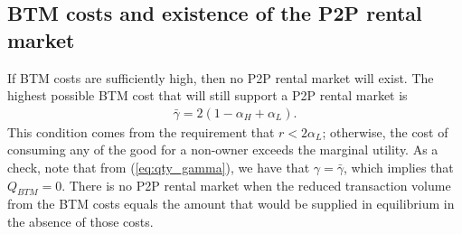 \documentclass[11pt]{article}
\begin{document}
\subsection{BTM costs and existence of the P2P rental market}
If BTM costs are sufficiently high, then no P2P rental market will exist. 
The highest possible BTM cost that will still support a P2P rental market is 
\begin{align} 
  \bar{\gamma} = 2(1-\alpha_H + \alpha_L). 
\end{align}
This condition comes from the requirement that  $r < 2 \alpha_L$; otherwise, the cost of consuming any of the good for a non-owner exceeds the marginal utility. 
As a check, note that from (\ref{eq:qty_gamma}), we have that $\gamma = \bar{\gamma}$, which implies that $Q_{BTM} = 0$.
There is no P2P rental market when the reduced transaction volume from the BTM costs equals the amount that would be supplied in equilibrium in the absence of those costs. 

\end{document}
